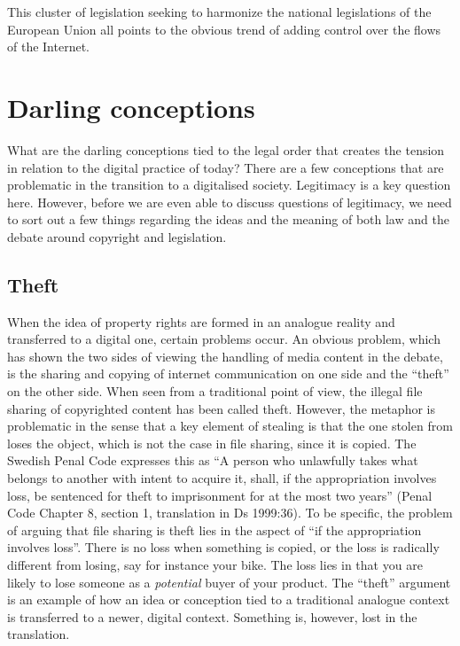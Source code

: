 This cluster of legislation seeking to harmonize the national legislations of
the European Union all points to the obvious trend of adding control over the
f\hbox{}lows of the Internet. 


\section{Darling conceptions}
\label{s:darling_conceptions:darling_conceptions}

What are the darling conceptions tied to the legal order that creates the
tension in relation to the digital practice of today? There are a few
conceptions that are problematic in the transition to a digitalised society.
Legitimacy is a key question here. However, before we are even able to discuss
questions of legitimacy, we need to sort out a few things regarding the ideas
and the meaning of both law and the debate around copyright and legislation. 


\subsection{Theft}
\label{ss:darling_conceptions:darling_conceptions:theft}

When the idea of property rights are formed in an analogue reality and
transferred to a digital one, certain problems occur. An obvious problem, which
has shown the two sides of viewing the handling of media content in the debate,
is the sharing and copying of internet communication on one side and the
``theft'' on the other side. When seen from a traditional point of view, the
illegal f\hbox{}ile sharing of copyrighted content has been called theft. However, the
metaphor is problematic in the sense that a key element of stealing is that the
one stolen from loses the object, which is not the case in f\hbox{}ile sharing, since
it is copied. The Swedish Penal Code expresses this as ``A person who unlawfully
takes what belongs to another with intent to acquire it, shall, if the
appropriation involves loss, be sentenced for theft to imprisonment for at the
most two years'' (Penal Code Chapter 8, section 1, translation in Ds 1999:36).
To be specif\hbox{}ic, the problem of arguing that f\hbox{}ile sharing is theft lies in the
aspect of ``if the appropriation involves loss''. There is no loss when
something is copied, or the loss is radically dif\hbox{}ferent from losing, say for
instance your bike. The loss lies in that you are likely to lose someone as a
\textit{potential} buyer of your product. The ``theft'' argument is an example
of how an idea or conception tied to a traditional analogue context is
transferred to a newer, digital context.  Something is, however, lost in the
translation.


